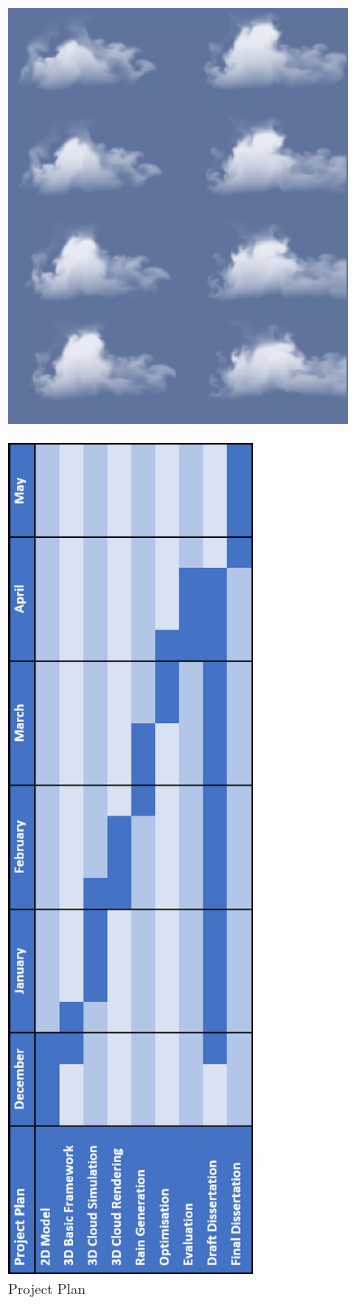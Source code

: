 \begin{figure}[h!]
	\label{fig:Simulation_of_Cloud_Dynamics_on_Graphics_Hardware}
	\centering
	\includegraphics[width=90mm]{images/Simulation_of_Cloud_Dynamics_on_Graphics_Hardware.PNG}
	\caption{\citet{HarrisEtAl03}}
\end{figure}
\begin{figure}[h!]\label{fig:Timetable}
  \centering
  \includegraphics[height=220mm,keepaspectratio]{images/timetable.PNG}
  \caption{Project Plan}
\end{figure}